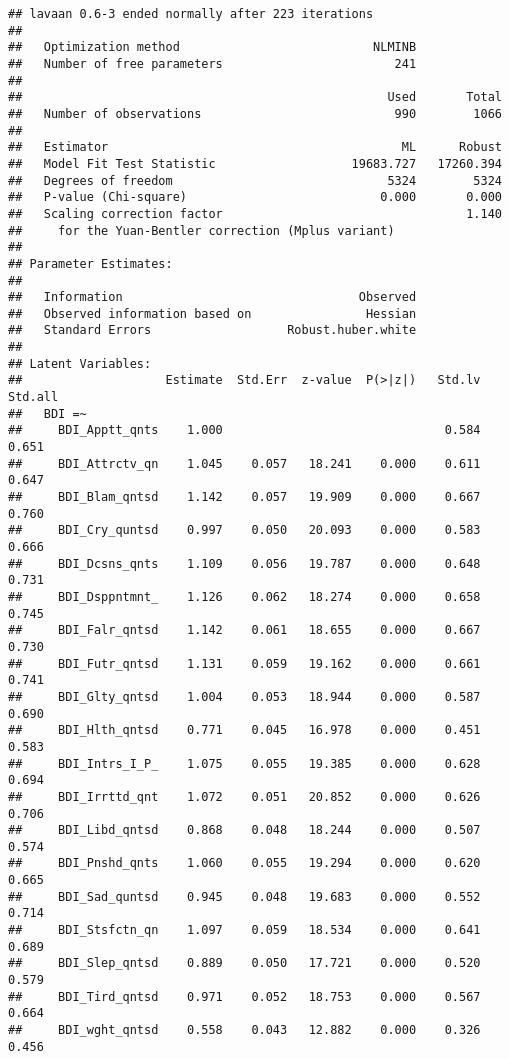 \documentclass[]{article}
\begin{document}
\begin{verbatim}
## lavaan 0.6-3 ended normally after 223 iterations
## 
##   Optimization method                           NLMINB
##   Number of free parameters                        241
## 
##                                                   Used       Total
##   Number of observations                           990        1066
## 
##   Estimator                                         ML      Robust
##   Model Fit Test Statistic                   19683.727   17260.394
##   Degrees of freedom                              5324        5324
##   P-value (Chi-square)                           0.000       0.000
##   Scaling correction factor                                  1.140
##     for the Yuan-Bentler correction (Mplus variant)
## 
## Parameter Estimates:
## 
##   Information                                 Observed
##   Observed information based on                Hessian
##   Standard Errors                   Robust.huber.white
## 
## Latent Variables:
##                    Estimate  Std.Err  z-value  P(>|z|)   Std.lv  Std.all
##   BDI =~                                                                
##     BDI_Apptt_qnts    1.000                               0.584    0.651
##     BDI_Attrctv_qn    1.045    0.057   18.241    0.000    0.611    0.647
##     BDI_Blam_qntsd    1.142    0.057   19.909    0.000    0.667    0.760
##     BDI_Cry_quntsd    0.997    0.050   20.093    0.000    0.583    0.666
##     BDI_Dcsns_qnts    1.109    0.056   19.787    0.000    0.648    0.731
##     BDI_Dsppntmnt_    1.126    0.062   18.274    0.000    0.658    0.745
##     BDI_Falr_qntsd    1.142    0.061   18.655    0.000    0.667    0.730
##     BDI_Futr_qntsd    1.131    0.059   19.162    0.000    0.661    0.741
##     BDI_Glty_qntsd    1.004    0.053   18.944    0.000    0.587    0.690
##     BDI_Hlth_qntsd    0.771    0.045   16.978    0.000    0.451    0.583
##     BDI_Intrs_I_P_    1.075    0.055   19.385    0.000    0.628    0.694
##     BDI_Irrttd_qnt    1.072    0.051   20.852    0.000    0.626    0.706
##     BDI_Libd_qntsd    0.868    0.048   18.244    0.000    0.507    0.574
##     BDI_Pnshd_qnts    1.060    0.055   19.294    0.000    0.620    0.665
##     BDI_Sad_quntsd    0.945    0.048   19.683    0.000    0.552    0.714
##     BDI_Stsfctn_qn    1.097    0.059   18.534    0.000    0.641    0.689
##     BDI_Slep_qntsd    0.889    0.050   17.721    0.000    0.520    0.579
##     BDI_Tird_qntsd    0.971    0.052   18.753    0.000    0.567    0.664
##     BDI_wght_qntsd    0.558    0.043   12.882    0.000    0.326    0.456

\end{verbatim}
\end{document}
